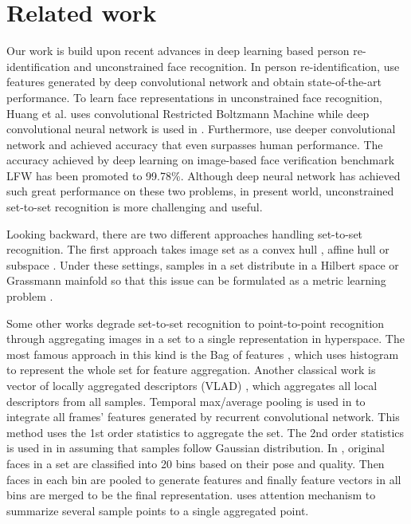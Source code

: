 \section{Related work}

Our work is build upon recent advances in deep learning based person re-identification and unconstrained face recognition.  In person re-identification, \cite{li2014deepreid,xiao2016learning,zheng2016mars} use features generated by deep convolutional network and obtain state-of-the-art performance.  To learn face representations in unconstrained face recognition, Huang et al. \cite{Huang2012Learning} uses convolutional Restricted Boltzmann Machine while deep convolutional neural network is used  in \cite{taigman2014deepface, sun2014deep1}. Furthermore,  \cite{sun2015deeply,schroff2015facenet} use deeper convolutional network and achieved accuracy that even surpasses human performance. The accuracy achieved by deep learning on image-based face verification benchmark LFW\cite{learnedlabeled} has been promoted to 99.78\%. Although deep neural network has achieved such great performance on these two problems, in present world, unconstrained set-to-set recognition is more challenging and useful.


Looking backward, there are two different approaches handling set-to-set recognition. The first approach takes image set as a convex hull \cite{cevikalp2010face}, affine hull \cite{hu2011sparse} or subspace \cite{basri2011approximate, Huang2015Projection}. Under these settings, samples in a set distribute in a Hilbert space or Grassmann mainfold so that this issue can be formulated as a metric learning problem \cite{lu2015multi,yang2013face}.

Some other works degrade set-to-set recognition to point-to-point recognition through aggregating images in a set to a single representation in hyperspace. The most famous approach in this kind is the Bag of features \cite{lazebnik2006beyond}, which uses histogram to represent the whole set for feature aggregation. Another classical work is vector of locally aggregated descriptors (VLAD) \cite{jegou2010aggregating}, which aggregates all local descriptors from all samples. Temporal max/average pooling is used in \cite{wu2016deep} to integrate all frames' features generated by recurrent convolutional network. This method uses the 1st order statistics to aggregate the set. The 2nd order statistics is used in \cite{wang2012covariance, Zhu2013From} in assuming that samples follow Gaussian distribution. In \cite{hassner2016pooling}, original faces in a set are classified into 20 bins based on their pose and quality. Then faces in each bin are pooled to generate features and finally feature vectors in all bins are merged to be the final representation. \cite{yang2016neural} uses attention mechanism to summarize several sample points to a single aggregated point. 



